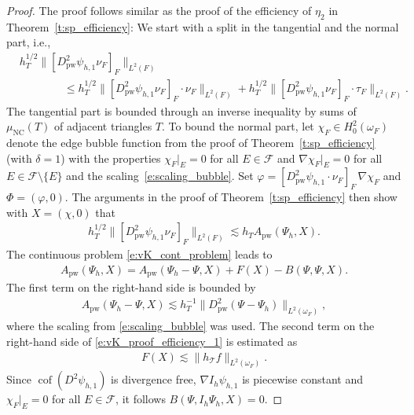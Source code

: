 \documentclass[a4paper]{amsart}
\theoremstyle{definition}
\numberwithin{equation}{section}
\numberwithin{theorem}{section}
\newcommand{\pw}{\mathrm{pw}}
\newcommand{\nc}{\mathrm{NC}}
\newcommand{\tri}{\mathcal{T}}
\newcommand{\cof}{\operatorname{cof}}
\begin{document}
\begin{proof}
    The proof follows similar as the proof of the efficiency of 
    $\eta_2$ in Theorem~\ref{t:sp_efficiency}: 
    We start with a split in the tangential and the normal part,
    i.e.,
    \begin{align*}
        &h_T^{1/2} \lVert [D_\pw^2 \psi_{h,1}\nu_F]_F\rVert_{L^2(F)}\\
        &\qquad\qquad
        \leq h_T^{1/2} \lVert [D_\pw^2 \psi_{h,1}\nu_F]_F\cdot\nu_F\rVert_{L^2(F)}
        + h_T^{1/2} \lVert [D_\pw^2 \psi_{h,1}\nu_F]_F\cdot\tau_F\rVert_{L^2(F)}.
    \end{align*}
    The tangential part is bounded through an inverse inequality 
    by sums of $\mu_\nc(T)$ of adjacent triangles $T$.
    To bound the normal part, let $\chi_{F}\in H^2_0(\omega_F)$ denote the 
    edge bubble function from the proof of Theorem~\ref{t:sp_efficiency}
    (with $\delta=1$) with the properties 
    $\chi_F\vert_E=0$ for all $E\in\mathcal{F}$ and 
    $\nabla\chi_F\vert_E=0$ for all $E\in\mathcal{F}\setminus\{E\}$
    and the scaling~\eqref{e:scaling_bubble}. 
    Set $\varphi=[D_\pw^2\psi_{h,1}\cdot\nu_F]_F\,\nabla\chi_F$
    and $\Phi=(\varphi,0)$. 
    The arguments in the proof of Theorem~\ref{t:sp_efficiency}
    then show with $X = (\chi,0)$ that
    \begin{align*}
        h_T^{1/2}\lVert [D_\pw^2 \psi_{h,1}\nu_F]_F\rVert_{L^2(F)}
        \lesssim h_T A_\pw(\Psi_h,X).
    \end{align*}
    The continuous problem \eqref{e:vK_cont_problem} leads to
    \begin{align}\label{e:vK_proof_efficiency_1}
        A_\pw(\Psi_h,X)
        = A_\pw(\Psi_h-\Psi,X) +
        F(X)-B(\Psi,\Psi,X).
    \end{align}
    The first term on the right-hand side is bounded by 
    \begin{align*}
        A_\pw(\Psi_h-\Psi,X)
        \lesssim h_T^{-1}\lVert D_\pw^2(\Psi-\Psi_h)\rVert_{L^2(\omega_F)},
    \end{align*}
    where the scaling from \eqref{e:scaling_bubble} was used.
    The second term on the right-hand side of \eqref{e:vK_proof_efficiency_1}
    is estimated as 
    \begin{align*}
        F(X) 
        \lesssim \lVert h_\tri f\rVert_{L^2(\omega_F)}.
    \end{align*}
    Since $\cof(D^2\psi_{h,1})$ is divergence free, $\nabla I_h \psi_{h,1}$ 
    is piecewise constant and $\chi_F\vert_E=0$ for all 
    $E\in\mathcal{F}$, it follows $B(\Psi,I_h\Psi_h,X)=0$.

\end{proof}
\end{document}
